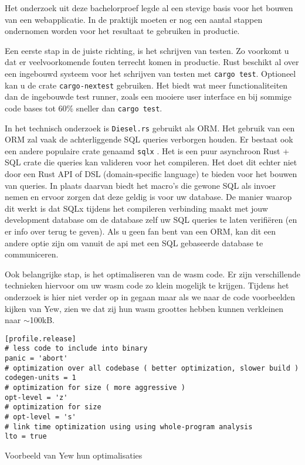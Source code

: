 Het onderzoek uit deze bachelorproef legde al een stevige basis voor het bouwen van een
webapplicatie. In de praktijk moeten er nog een aantal stappen ondernomen worden voor het resultaat
te gebruiken in productie.

Een eerste stap in de juiste richting, is het schrijven van testen. Zo voorkomt u dat er
veelvoorkomende fouten terrecht komen in productie. Rust beschikt al over een ingebouwd systeem voor
het schrijven van testen met \texttt{cargo test}. Optioneel kan u de crate
\texttt{cargo-nextest} gebruiken. Het biedt wat meer functionaliteiten dan de ingebouwde
test runner, zoals een mooiere user interface en bij sommige code bases tot 60\% sneller dan
\texttt{cargo test}.

In het technisch onderzoek is \texttt{Diesel.rs} gebruikt als ORM. Het gebruik van een ORM
zal vaak de achterliggende SQL queries verborgen houden. Er bestaat ook een andere populaire crate
genaamd \texttt{sqlx} \cite{sqlx}. Het is een puur asynchroon Rust + SQL crate die queries
kan valideren voor het compileren. Het doet dit echter niet door een Rust API of DSL
(domain-specific language) te bieden voor het bouwen van queries. In plaats daarvan biedt het
macro's die gewone SQL als invoer nemen en ervoor zorgen dat deze geldig is voor uw database. De
manier waarop dit werkt is dat SQLx tijdens het compileren verbinding maakt met jouw development
database om de database zelf uw SQL queries te laten verifiëren (en er info over terug te geven).
Als u geen fan bent van een ORM, kan dit een andere optie zijn om vanuit de api met een SQL
gebaseerde database te communiceren.

Ook belangrijke stap, is het optimaliseren van de wasm code. Er zijn verschillende technieken
hiervoor om uw wasm code zo klein mogelijk te krijgen. Tijdens het onderzoek is hier niet verder op
in gegaan maar als we naar de code voorbeelden kijken van Yew, zien we dat zij hun wasm groottes
hebben kunnen verkleinen naar $\sim$100kB. \cite{wasm_size}

\begin{listing}[h]
\begin{verbatim}
[profile.release]
# less code to include into binary
panic = 'abort'
# optimization over all codebase ( better optimization, slower build )
codegen-units = 1
# optimization for size ( more aggressive )
opt-level = 'z'
# optimization for size
# opt-level = 's'
# link time optimization using using whole-program analysis
lto = true
\end{verbatim}
\caption{Voorbeeld van Yew hun optimalisaties}
\end{listing}

